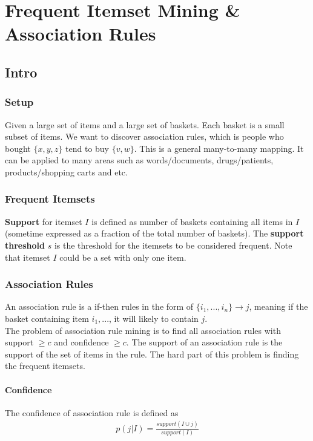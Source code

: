 \chapter{Frequent Itemset Mining \& Association Rules} 

\section{Intro}
\subsection{Setup}
Given a large set of items and a large set of baskets. Each basket is a small subset of items. We want to discover association rules, which is people who bought $\{x, y, z \}$ tend to buy $\{v, w\}$. This is a general many-to-many mapping. It can be applied to many areas such as words/documents, drugs/patients, products/shopping carts and etc. 

\subsection{Frequent Itemsets} 
\textbf{Support} for itemset $I$ is defined as number of baskets containing all items in $I$ (sometime expressed as a fraction of the total number of baskets). The \textbf{support threshold} $s$ is the threshold for the itemsets to be considered frequent. Note that itemset $I$ could be a set with only one item. 

\subsection{Association Rules} 
An association rule is a if-then rules in the form of $\{ i_1, ..., i_n \} \rightarrow j$, meaning if the basket containing item $i_1, ...$, it will likely to contain $j$. \\

The problem of association rule mining is to find all association rules with support $\geq c$ and confidence $\geq c$. The support of an association rule is the support of the set of items in the rule. The hard part of this problem is finding the frequent itemsets. 

\subsubsection{Confidence}
The confidence of association rule is defined as 
    \begin{align*}
    p(j|I) = \frac{support(I \cup j)}{support(I)}
    \end{align*}
    
